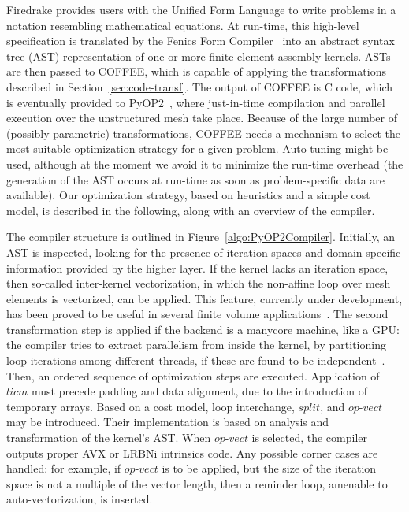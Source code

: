 \documentclass[conference]{IEEEtran}
\begin{document}
Firedrake provides users with the Unified Form Language to write problems in a notation resembling mathematical equations. At run-time, this high-level specification is translated by the Fenics Form Compiler~\cite{FFC-Compiler} into an abstract syntax tree (AST) representation of one or more finite element assembly kernels. ASTs are then passed to COFFEE, which is capable of applying the transformations described in Section~\ref{sec:code-transf}. The output of COFFEE is C code, which is eventually provided to PyOP2~\cite{pyop2isc}, where just-in-time compilation and parallel execution over the unstructured mesh take place. Because of the large number of (possibly parametric) transformations, COFFEE needs a mechanism to select the most suitable optimization strategy for a given problem. Auto-tuning might be used, although at the moment we avoid it to minimize the run-time overhead (the generation of the AST occurs at run-time as soon as problem-specific data are available). Our optimization strategy, based on heuristics and a simple cost model, is described in the following, along with an overview of the compiler.

The compiler structure is outlined in Figure~\ref{algo:PyOP2Compiler}. Initially, an AST is inspected, looking for the presence of iteration spaces and domain-specific information provided by the higher layer. If the kernel lacks an iteration space, then so-called inter-kernel vectorization, in which the non-affine loop over mesh elements is vectorized, can be applied. This feature, currently under development, has been proved to be useful in several finite volume applications~\cite{inter-kernel-vect}. The second transformation step is applied if the backend is a manycore machine, like a GPU: the compiler tries to extract parallelism from inside the kernel, by partitioning loop iterations among different threads, if these are found to be independent~\cite{pyop2isc}. Then, an ordered sequence of optimization steps are executed. Application of $licm$ must precede padding and data alignment, due to the introduction of temporary arrays. Based on a cost model, loop interchange, $split$, and $op$-$vect$ may be introduced. Their implementation is based on analysis and transformation of the kernel's AST. When $op$-$vect$ is selected, the compiler outputs proper AVX or LRBNi intrinsics code. Any possible corner cases are handled: for example, if $op$-$vect$ is to be applied, but the size of the iteration space is not a multiple of the vector length, then a reminder loop, amenable to auto-vectorization, is inserted.
\end{document}

